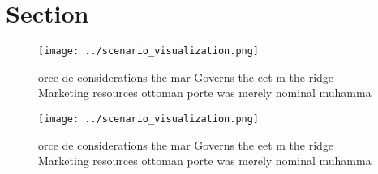 \documentclass[a4paper]{article}
\begin{document}
\section{Section}

\begin{figure}
\centering
\texttt{[image: ../scenario\_visualization.png]}
\caption{orce de considerations the mar Governs the eet m the ridge Marketing resources ottoman porte was merely nominal muhamma
}
\end{figure}
 
\begin{figure}
\centering
\texttt{[image: ../scenario\_visualization.png]}
\caption{orce de considerations the mar Governs the eet m the ridge Marketing resources ottoman porte was merely nominal muhamma
}
\end{figure}
 
\end{document}
